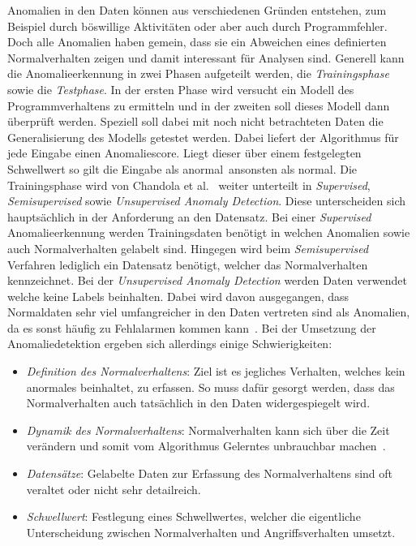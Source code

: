         Anomalien in den Daten können aus verschiedenen Gründen entstehen, zum Beispiel durch böswillige Aktivitäten oder aber auch durch Programmfehler.
        Doch alle Anomalien haben gemein, dass sie ein Abweichen eines definierten Normalverhalten zeigen und damit interessant für Analysen sind.
        Generell kann die Anomalieerkennung in zwei Phasen aufgeteilt werden, die \textit{Trainingsphase} sowie die \textit{Testphase}.
        In der ersten Phase wird versucht ein Modell des Programmverhaltens zu ermitteln und in der zweiten soll dieses Modell dann überprüft werden.
        Speziell soll dabei mit noch nicht betrachteten Daten die Generalisierung des Modells getestet werden. 
        Dabei liefert der Algorithmus für jede Eingabe einen Anomaliescore.
        Liegt dieser über einem festgelegten Schwellwert so gilt die Eingabe als \glqq anormal\grqq \ ansonsten als \glqq normal\grqq.
        Die Trainingsphase wird von Chandola et al.~\cite{ANOMALYSURVEY} weiter unterteilt in \textit{Supervised}, \textit{Semisupervised} sowie \textit{Unsupervised Anomaly Detection}.
        Diese unterscheiden sich hauptsächlich in der Anforderung an den Datensatz. 
        Bei einer \textit{Supervised} Anomalieerkennung werden Trainingsdaten benötigt in welchen Anomalien sowie auch Normalverhalten gelabelt sind.
        Hingegen wird beim \textit{Semisupervised} Verfahren lediglich ein Datensatz benötigt, welcher das Normalverhalten kennzeichnet.
        Bei der \textit{Unsupervised Anomaly Detection} werden Daten verwendet welche keine Labels beinhalten.
        Dabei wird davon ausgegangen, dass Normaldaten sehr viel umfangreicher in den Daten vertreten sind als Anomalien, da es sonst häufig zu Fehlalarmen kommen kann~\cite{ANOMALYSURVEY2}.
        Bei der Umsetzung der Anomaliedetektion ergeben sich allerdings einige Schwierigkeiten:
        
        \begin{itemize}
            \item \textit{Definition des Normalverhaltens}:
                Ziel ist es jegliches Verhalten, welches kein anormales beinhaltet, zu erfassen.
                So muss dafür gesorgt werden, dass das Normalverhalten auch tatsächlich in den Daten widergespiegelt wird. 

            \item \textit{Dynamik des Normalverhaltens}:
                Normalverhalten kann sich über die Zeit verändern und somit vom Algorithmus Gelerntes unbrauchbar machen~\cite{ANOMALYSURVEY}.

            \item \textit{Datensätze}:
                Gelabelte Daten zur Erfassung des Normalverhaltens sind oft veraltet oder nicht sehr detailreich. 

            \item \textit{Schwellwert}:
                Festlegung eines Schwellwertes, welcher die eigentliche Unterscheidung zwischen Normalverhalten und Angriffsverhalten umsetzt.
        \end{itemize}


